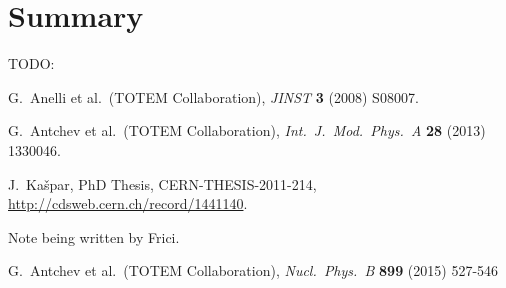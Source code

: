\documentclass[TOTEM]{cern/cernphprep}
\def\etal{et al.}
\def\TODO#1{{\color{red}TODO: #1}}
\def\Name#1{#1, }
\def\Review#1#2#3#4{{\it #1} {\bf #2} (#3) #4}
\def\hang{\hangindent=\parindent}
\def\>{\par\vskip\itskip\parindent\itindent\indent\hang\llap{\hbox to3mm{$\bullet$\hss}}}
\def\>E{\par\vskip\itskip\parindent\itindent\indent\hang\llap{\hbox to3mm{\hss}}}
\def\>>{\par\vskip\iitskip\parindent\iitindent\indent\hang\llap{\hbox to\iitindent{\hss--\ }}}
\begin{document}

\section{Summary}
\label{s:sum}

\> \TODO{}


\begin{thebibliography}{99}

	\Name{G.~Anelli \etal{}~(TOTEM Collaboration)}
	\Review{JINST}{3}{2008}{S08007}.

	\Name{G.~Antchev \etal{}~(TOTEM Collaboration)}
	\Review{Int.~J.~Mod.~Phys.~A}{28}{2013}{1330046}.

	\Name{J.~Ka\v spar}
	PhD Thesis, CERN-THESIS-2011-214,
	\url{http://cdsweb.cern.ch/record/1441140}.

	Note being written by Frici.

	\Name{G.~Antchev \etal{}~(TOTEM Collaboration)}
	\Review{Nucl.~Phys.~B}{899}{2015}{527-546}

\end{thebibliography}
\end{document}

